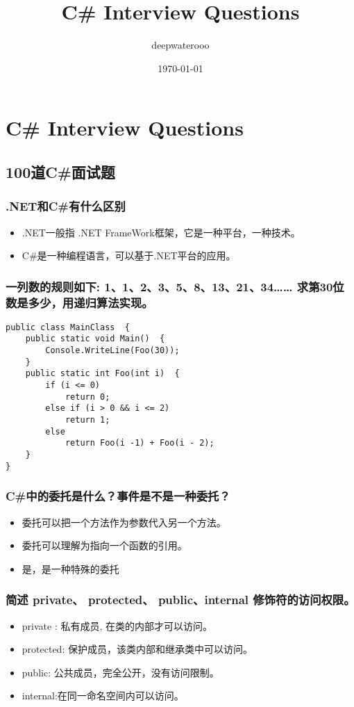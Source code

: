 \documentclass[9pt, b5paper]{article}
\author{deepwaterooo}
\date{\today}
\title{C\# Interview Questions}
\begin{document}
\maketitle
\tableofcontents


\section{C\# Interview Questions}
\label{sec-1}
\subsection{100道C\#面试题}
\label{sec-1-1}
\subsubsection{.NET和C\#有什么区别}
\label{sec-1-1-1}
\begin{itemize}
\item .NET一般指 .NET FrameWork框架，它是一种平台，一种技术。
\item C\#是一种编程语言，可以基于.NET平台的应用。
\end{itemize}
\subsubsection{一列数的规则如下: 1、1、2、3、5、8、13、21、34\ldots{}\ldots{} 求第30位数是多少，用递归算法实现。}
\label{sec-1-1-2}
\begin{verbatim}
public class MainClass  { 
    public static void Main()  { 
        Console.WriteLine(Foo(30)); 
    } 
    public static int Foo(int i)  { 
        if (i <= 0) 
            return 0; 
        else if (i > 0 && i <= 2) 
            return 1; 
        else
            return Foo(i -1) + Foo(i - 2); 
    } 
}
\end{verbatim}
\subsubsection{C\#中的委托是什么？事件是不是一种委托？}
\label{sec-1-1-3}
\begin{itemize}
\item 委托可以把一个方法作为参数代入另一个方法。
\item 委托可以理解为指向一个函数的引用。
\item 是，是一种特殊的委托
\end{itemize}
\subsubsection{简述 private、 protected、 public、internal 修饰符的访问权限。}
\label{sec-1-1-4}
\begin{itemize}
\item private : 私有成员, 在类的内部才可以访问。
\item protected: 保护成员，该类内部和继承类中可以访问。
\item public: 公共成员，完全公开，没有访问限制。
\item internal:在同一命名空间内可以访问。
\end{itemize}
\end{document}

